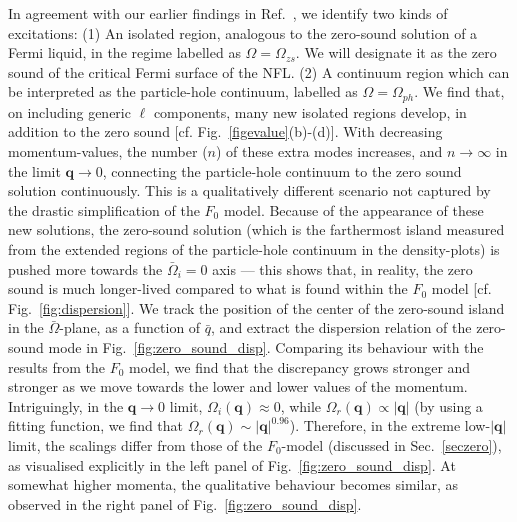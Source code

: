 \documentclass[aps, prb, onecolumn, nofootinbib, citeautoscript, 10pt]{revtex4-2}
\newcommand{\bq}{\mathbf{q}}
\begin{document}
In agreement with our earlier findings in Ref.~\cite{ips-kazi}, we identify two kinds of excitations: (1) An isolated region, analogous to the zero-sound solution of a Fermi liquid, in the regime labelled as $ \Omega = \Omega_{zs} $. We will designate it as the zero sound of the critical Fermi surface of the NFL. (2) A continuum region which can be interpreted as the particle-hole continuum, labelled as $\Omega = \Omega_{ph} $.
We find that, on including generic $\ell$ components, many new isolated regions develop, in addition to the zero sound [cf. Fig.~\ref{figevalue}(b)-(d)]. With decreasing momentum-values, the number ($n$) of these extra modes increases, and $ n \rightarrow \infty $ in the limit $\bq\rightarrow 0$, connecting the particle-hole continuum to the zero sound solution continuously. This is a qualitatively different scenario not captured by the drastic simplification of the $F_0$ model. Because of the appearance of these new solutions, the zero-sound solution (which is the farthermost island measured from the extended regions of the particle-hole continuum in the density-plots) is pushed more towards the $\bar{\Omega}_i = 0$ axis --- this shows that, in reality, the zero sound is much longer-lived compared to what is found within the $F_0$ model [cf. Fig.~\ref{fig:dispersion}]. We track the position of the center of the zero-sound island in the $\bar \Omega $-plane, as a function of $\bar q $, and extract the dispersion relation of the zero-sound mode in Fig.~\ref{fig:zero_sound_disp}.
Comparing its behaviour with the results from the $F_0$ model, we find that the discrepancy grows stronger and stronger as we move towards the lower and lower values of the momentum. Intriguingly, in the $ \mathbf q \rightarrow 0$ limit, $\Omega_i(\bq)\approx 0 $, while $\Omega_r(\bq)\propto |\bq| $ (by using a fitting function, we find that $ \Omega_r(\bq)\sim |\mathbf q|^{0.96}$). Therefore, in the extreme low-$|\mathbf q|$ limit, the scalings differ from those of the $F_0$-model (discussed in Sec.~\ref{seczero}), as visualised explicitly in the left panel of Fig.~\ref{fig:zero_sound_disp}. At somewhat higher momenta, the qualitative behaviour becomes similar, as observed in the right panel of Fig.~\ref{fig:zero_sound_disp}.
	
\end{document}
